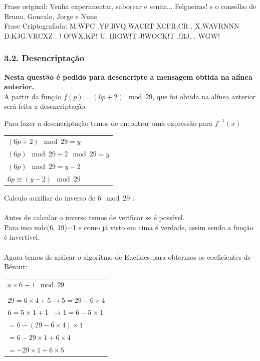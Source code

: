 \documentclass[12pt]{article}
\begin{document}
    \noindent Frase original: Venha experimentar, saborear e sentir... Felgueiras! e o conselho de Bruno, Goncalo, Jorge e Nuno\\
    
    \noindent Frase Criptografada: M.WPC .YF.RVQ.WACRT XCI!R.CR . X.WAVRNNN D.KJG.VRCXZ . ! O!WX.KP! U. IRGW!T J!WOCK!T ,!RJ. . WGW!
    
    \newpage
    \subsubsection{3.2. Desencriptação}
    \noindent \textbf{Nesta questão é pedido para desencripte a mensagem obtida na alínea anterior.}\\
    \noindent A partir da função  \(f(p) = (6 p+ 2) \mod 29\), que foi obtida na alínea anterior será feita a desencriptação.\newline
    
    \noindent Para fazer a desencriptação temos de encontrar uma expressão para \( f^{-1}(x)\)
    \begin{center}
    \begin{tabular}{@{}l@{}}
        $(6 p + 2) \mod29 = y$\\
        $(6 p)\mod29 + 2\mod 29= y$\\
        $(6 p)\mod29 = y - 2$\\
        $6 p \equiv (y - 2) \mod29$
    \end{tabular}
    \end{center}
   \noindent  Calculo auxiliar do inverso de \( 6\mod29\) :\\\\
    \noindent Antes de calcular o inverso temos de verificar se é possível.\\
    \noindent Para isso mdc(6, 19)=1 e como já visto em cima é verdade, assim sendo a função é invertível.\\\\
    Agora temos de aplicar o algoritmo de Euclides para obtermos os coeficientes de Bézout:
    \begin{center}
    \begin{tabular}{@{}l@{}}
        $a\times6\equiv1\mod29$\\\\
        $29 = 6\times4 + 5 \rightarrow 5 = 29 - 6 \times 4$\\
        $6 = 5\times1 +1 \hspace*{1.9mm} \rightarrow 1 = 6 - 5 \times 1$\\
        \hspace*{3.6cm}$= 6 - (29 - 6 \times 4) \times 1$\\
        \hspace*{3.6cm}$= 6 - 29 \times 1 + 6 \times 4$\\
        \hspace*{3.6cm}$= -29 \times 1 + 6 \times 5$\\
    \end{tabular}
    \end{center}
    
\end{document}
